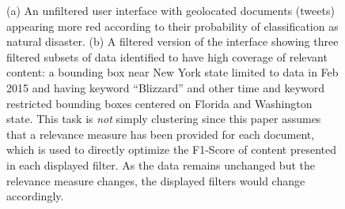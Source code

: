 



\begin{figure}[t]
\begin{centering}
\par\end{centering}
\caption{(a) An unfiltered user interface with geolocated documents (tweets) appearing more red according to their probability of classification as natural disaster.  (b) A filtered version of the interface showing three filtered subsets of data identified to have high coverage of relevant content: a bounding box near New York state limited to data in Feb 2015 and having keyword ``Blizzard'' and other time and keyword restricted bounding boxes centered on Florida and Washington state.  This task is \emph{not} simply clustering since this paper assumes that a relevance measure has been provided for each document, which is used to directly optimize the F1-Score of content presented in each displayed filter.  As the data remains unchanged but the relevance measure changes, the displayed filters would change accordingly.}
\label{Fig:UseCase}
\end{figure}

